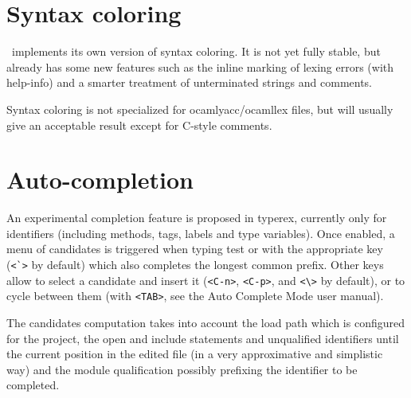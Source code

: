 \section{Syntax coloring}

\typerex\ implements its own version of syntax coloring. It is not
yet fully stable, but already has some new features such as the inline
marking of lexing errors (with help-info) and a smarter treatment of
unterminated strings and comments.

Syntax coloring is not specialized for ocamlyacc/ocamllex files, but
will usually give an acceptable result except for C-style comments.

\section{Auto-completion}

An experimental completion feature is proposed in typerex, currently
only for identifiers (including methods, tags, labels and type
variables). Once enabled, a menu of candidates is triggered when
typing test or with the appropriate key (\verb!<`>! by default) which
also completes the longest common prefix. Other keys allow to select a
candidate and insert it (\verb!<C-n>!, \verb!<C-p>!, and \verb!<\>! by
default), or to cycle between them (with \verb!<TAB>!, see the Auto
Complete Mode user manual).

The candidates computation takes into account the load path which is
configured for the project, the open and include statements and
unqualified identifiers until the current position in the edited file (in a
very approximative and simplistic way) and the module qualification
possibly prefixing the identifier to be completed.





